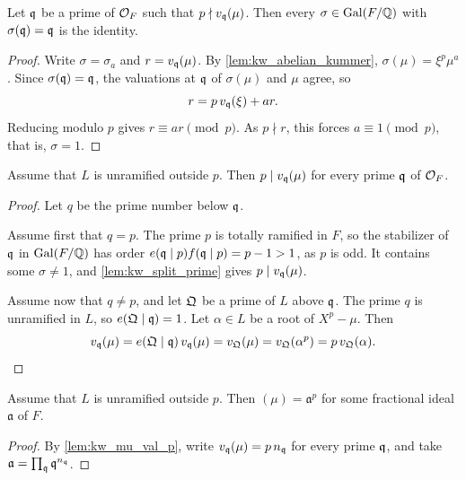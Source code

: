 \begin{lemma}
  \label{lem:kw_split_prime}
  \leanok
  Let $\mathfrak{q}$ be a prime of $\mathcal{O}_F$ such that $p \nmid v_{\mathfrak{q}}(\mu)$. Then every $\sigma \in
  \mathrm{Gal}(F/\mathbb{Q})$ with $\sigma(\mathfrak{q}) = \mathfrak{q}$ is the identity.
\end{lemma}

\begin{proof}
  \leanok
  Write $\sigma = \sigma_a$ and $r = v_{\mathfrak{q}}(\mu)$. By \ref{lem:kw_abelian_kummer},
  $\sigma(\mu) = \xi^p\mu^a$. Since $\sigma(\mathfrak{q}) = \mathfrak{q}$, the valuations at $\mathfrak{q}$ of $\sigma(\mu)$
  and $\mu$ agree, so
  \[
    r = p\,v_{\mathfrak{q}}(\xi) + a r.
  \]
  Reducing modulo $p$ gives $r \equiv ar \pmod p$. As $p \nmid r$, this forces $a \equiv 1
  \pmod p$, that is, $\sigma = 1$.
\end{proof}

\begin{lemma}
  \label{lem:kw_mu_val_p}
  \leanok
  Assume that $L$ is unramified outside $p$. Then $p \mid v_{\mathfrak{q}}(\mu)$ for every prime $\mathfrak{q}$ of
  $\mathcal{O}_F$.
\end{lemma}

\begin{proof}
  \leanok
  Let $q$ be the prime number below $\mathfrak{q}$.

  Assume first that $q = p$. The prime $p$ is totally ramified in $F$, so the stabilizer of $\mathfrak{q}$
  in $\mathrm{Gal}(F/\mathbb{Q})$ has order $e(\mathfrak{q}\mid p) f(\mathfrak{q}\mid p) = p - 1 > 1$, as $p$ is odd. It contains
  some $\sigma \neq 1$, and \ref{lem:kw_split_prime} gives $p \mid v_{\mathfrak{q}}(\mu)$.

  Assume now that $q \neq p$, and let $\mathfrak{Q}$ be a prime of $L$ above $\mathfrak{q}$. The prime $q$ is
  unramified in $L$, so $e(\mathfrak{Q}\mid\mathfrak{q}) = 1$. Let $\alpha \in L$ be a root of $X^p - \mu$. Then
  \[
    v_{\mathfrak{q}}(\mu) = e(\mathfrak{Q}\mid\mathfrak{q})\, v_{\mathfrak{q}}(\mu) = v_{\mathfrak{Q}}(\mu) = v_{\mathfrak{Q}}(\alpha^p)
      = p\, v_{\mathfrak{Q}}(\alpha).
  \]
\end{proof}

\begin{lemma}
  \label{lem:kw_mu_pth_power_ideal}
  \leanok
  Assume that $L$ is unramified outside $p$. Then $(\mu) = \mathfrak{a}^p$ for some fractional
  ideal $\mathfrak{a}$ of $F$.
\end{lemma}

\begin{proof}
  \leanok
  By \ref{lem:kw_mu_val_p}, write $v_{\mathfrak{q}}(\mu) = p\,n_{\mathfrak{q}}$ for every prime $\mathfrak{q}$, and take
  $\mathfrak{a} = \prod_{\mathfrak{q}} \mathfrak{q}^{n_{\mathfrak{q}}}$.
\end{proof}

